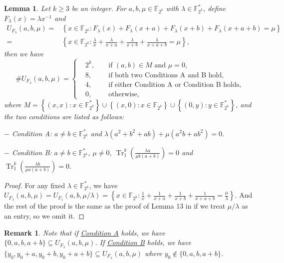 \documentclass[preprint,10pt]{elsarticle}
\newcommand{\F}{\mathbb{F}}
\newcommand{\0}{\textbf{0}}
\newcommand{\1}{\textbf{1}}
\newcommand{\TRACE}{\operatorname{Tr}_1^k}
\theoremstyle{plain}
\newtheorem{lemma}{Lemma}
\newtheorem{remark}{Remark}
\begin{document}
    \begin{lemma}\label{lemma:num_sol_second_dev}
        Let $k\ge 3$ be an integer.
        For $a,b,\mu\in\F_{2^k}$ with $\lambda\in\F_{2^k}^*$, define $F_{\lambda}(x)=\lambda x^{-1}$ and
        \begin{align*}
            U_{F_{\lambda}}(a,b,\mu)=&\left\{x\in\F_{2^k} : F_{\lambda}(x)+F_{\lambda}(x+a)+F_{\lambda}(x+b)+F_{\lambda}(x+a+b)=\mu\right\}\\
            =&\left\{ x\in\F_{2^k} : \frac{\lambda}{x}+\frac{\lambda}{x+a}+\frac{\lambda}{x+b}+\frac{\lambda}{x+a+b}=\mu \right\},
        \end{align*}
        then we have
        \[\# U_{F_{\lambda}}(a,b,\mu) = \left\{
            \begin{alignedat}{2}
                &2^k,&&\text{ if }(a,b)\in M\text{ and }\mu = 0,\\
                &8,&&\text{ if both two Conditions~A}\text{ and~B}\text{ hold,}\\
                &4,&&\text{ if either Condition~A}\text{ or Condition B} \text{ holds,}\\
                &0,&&\text{ otherwise},
            \end{alignedat}\right.\]
        where $M=\left\{ (x,x):x\in\F_{2^k}^* \right\}\cup\left\{ (x,0):x\in\F_{2^k} \right\}\cup\left\{ (0,y):y\in\F_{2^k}^* \right\}$, and the two conditions are listed as follows:

        \noindent $-$  Condition A: $a\ne b\in\F_{2^k}^*$ and $\lambda(a^2+b^2+ab)+\mu(a^2b+ab^2)=0$.\label{item_a}

        \noindent $-$  Condition B: $a\ne b\in\F_{2^k}^*$, $\mu\ne 0$, $\TRACE\left(\frac{\lambda a}{\mu b(a+b)}\right)=0$ and $\TRACE\left(\frac{\lambda b}{\mu a(a+b)}\right)=0$.\label{item_b}

    \end{lemma}
    \begin{proof}
        For any fixed $\lambda\in\F_{2^k}^*$, we have $U_{F_{\lambda}}(a,b,\mu)=U_{F_1}(a,b,\mu/\lambda)=\left\{ x\in\F_{2^k} : \frac{1}{x}+\frac{1}{x+a}+\frac{1}{x+b}+\frac{1}{x+a+b}=\frac{\mu}{\lambda} \right\}$.
        And the rest of the proof is the same as the proof of Lemma 13 in \cite{TangMM2022inversefunction} if we treat $\mu/\lambda$ as an entry, so we omit it. 
    \end{proof}
    \begin{remark}
        Note that if \hyperref[item_a]{Condition A} holds, we have $\{0,a,b,a+b\}\subseteq U_{F_{\lambda} }(a,b,\mu)$.
        If \hyperref[item_b]{Condition B} holds, we have $\{y_0,y_0+a,y_0+b,y_0+a+b\}\subseteq U_{F_{\lambda}}(a,b,\mu)$ where $y_0\notin\{0,a,b,a+b\}$.
    \end{remark}
\end{document}
